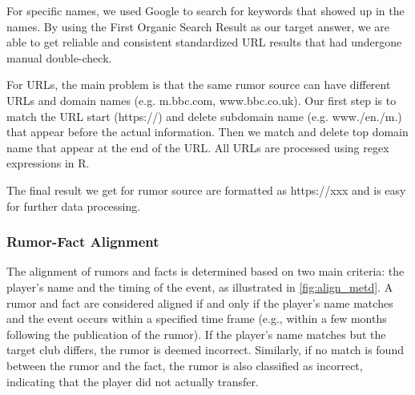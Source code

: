 For specific names, we used Google to search for keywords that showed up in the names. By using the First Organic Search Result as our target answer, we are able to get reliable and consistent standardized URL results that had undergone manual double-check.

For URLs, the main problem is that the same rumor source can have different URLs and domain names (e.g. m.bbc.com, www.bbc.co.uk). Our first step is to match the URL start (https://) and delete subdomain name (e.g. www./en./m.) that appear before the actual information. Then we match and delete top domain name that appear at the end of the URL. All URLs are processed using regex expressions in R.

The final result we get for rumor source are formatted as https://xxx and is easy for further data processing.

\subsubsection{Rumor-Fact Alignment}





The alignment of rumors and facts is determined based on two main criteria: the player's name and the timing of the event, as illustrated in \autoref{fig:align_metd}. A rumor and fact are considered aligned if and only if the player's name matches and the event occurs within a specified time frame (e.g., within a few months following the publication of the rumor). If the player's name matches but the target club differs, the rumor is deemed incorrect. Similarly, if no match is found between the rumor and the fact, the rumor is also classified as incorrect, indicating that the player did not actually transfer.

